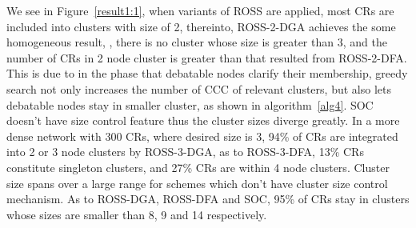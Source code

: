 We see in Figure~\ref{result1:1}, when variants of ROSS are applied, most CRs are included into clusters with size of 2, thereinto, ROSS-2-DGA achieves the some homogeneous result, \ie, there is no cluster whose size is greater than 3, and the number of CRs in 2 node cluster is greater than that resulted from ROSS-2-DFA.
This is due to in the phase that debatable nodes clarify their membership, greedy search not only increases the number of CCC of relevant clusters, but also lets debatable nodes stay in smaller cluster, as shown in algorithm~\ref{alg4}.
SOC doesn't have size control feature thus the cluster sizes diverge greatly.
In a more dense network with 300 CRs, where desired size is 3, 94\% of CRs are integrated into 2 or 3 node clusters by ROSS-3-DGA, as to ROSS-3-DFA, 13\% CRs constitute singleton clusters, and 27\% CRs are within 4 node clusters.
Cluster size spans over a large range for schemes which don't have cluster size control mechanism.
As to ROSS-DGA, ROSS-DFA and SOC, 95\% of CRs stay in clusters whose sizes are smaller than 8, 9 and 14 respectively.



